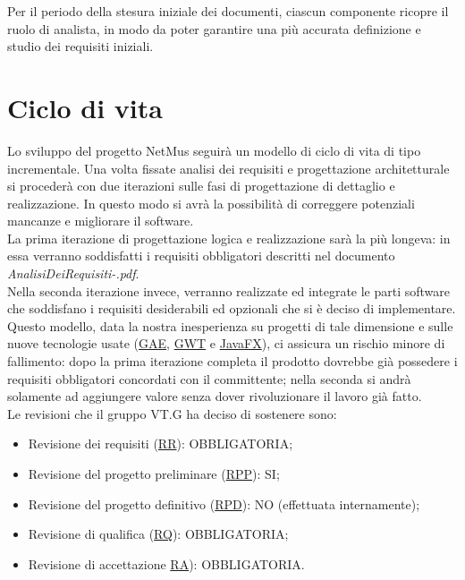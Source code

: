 Per il periodo della stesura iniziale dei documenti, ciascun
componente ricopre il ruolo di analista, in modo da poter garantire una pi\`u
accurata definizione e studio dei requisiti iniziali.

\chapter{Ciclo di vita}
\thispagestyle{fancy}
Lo sviluppo del progetto NetMus seguir\`a un modello di ciclo di vita
di tipo incrementale. Una volta fissate analisi dei
requisiti e progettazione architetturale si proceder\`a con due iterazioni sulle fasi di
progettazione di dettaglio e realizzazione. In questo modo si avr\`a la
possibilit\`a di correggere potenziali mancanze e migliorare il
software.\\
La prima iterazione di progettazione logica e realizzazione sar\`a la pi\`u
longeva: in essa verranno soddisfatti i requisiti obbligatori descritti nel
documento \emph{AnalisiDeiRequisiti-\versioneAR.pdf}.\\
Nella seconda iterazione invece, verranno realizzate ed integrate le parti
software che soddisfano i requisiti desiderabili ed opzionali che si \`e deciso
di implementare.\\

Questo modello, data la nostra inesperienza su progetti di tale dimensione e
sulle nuove tecnologie usate (\underline{GAE}, \underline{GWT} e
\underline{JavaFX}), ci assicura un rischio minore di fallimento: dopo la prima iterazione completa il prodotto dovrebbe
gi\`a possedere i requisiti obbligatori concordati con il committente; nella
seconda si andr\`a solamente ad aggiungere valore senza dover rivoluzionare il
lavoro gi\`a fatto.\\

Le revisioni che il gruppo VT.G ha deciso di sostenere sono:
\begin{itemize}
  \item Revisione dei requisiti (\underline{RR}): OBBLIGATORIA;
  \item Revisione del progetto preliminare (\underline{RPP}): SI;
  \item Revisione del progetto definitivo (\underline{RPD}): NO (effettuata
  internamente);
  \item Revisione di qualifica (\underline{RQ}): OBBLIGATORIA;
  \item Revisione di accettazione \underline{RA}): OBBLIGATORIA.
\end{itemize} \vspace{0.5cm}

